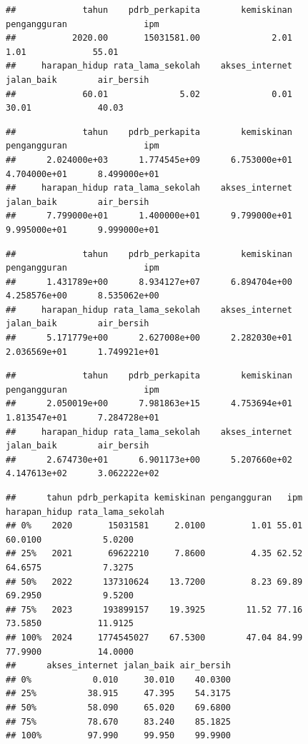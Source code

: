 \documentclass[
  12pt,
]{article}
\begin{document}
\begin{verbatim}
##             tahun    pdrb_perkapita        kemiskinan      pengangguran               ipm 
##           2020.00       15031581.00              2.01              1.01             55.01 
##     harapan_hidup rata_lama_sekolah    akses_internet        jalan_baik        air_bersih 
##             60.01              5.02              0.01             30.01             40.03
\end{verbatim}

\begin{verbatim}
##             tahun    pdrb_perkapita        kemiskinan      pengangguran               ipm 
##      2.024000e+03      1.774545e+09      6.753000e+01      4.704000e+01      8.499000e+01 
##     harapan_hidup rata_lama_sekolah    akses_internet        jalan_baik        air_bersih 
##      7.799000e+01      1.400000e+01      9.799000e+01      9.995000e+01      9.999000e+01
\end{verbatim}

\begin{verbatim}
##             tahun    pdrb_perkapita        kemiskinan      pengangguran               ipm 
##      1.431789e+00      8.934127e+07      6.894704e+00      4.258576e+00      8.535062e+00 
##     harapan_hidup rata_lama_sekolah    akses_internet        jalan_baik        air_bersih 
##      5.171779e+00      2.627008e+00      2.282030e+01      2.036569e+01      1.749921e+01
\end{verbatim}

\begin{verbatim}
##             tahun    pdrb_perkapita        kemiskinan      pengangguran               ipm 
##      2.050019e+00      7.981863e+15      4.753694e+01      1.813547e+01      7.284728e+01 
##     harapan_hidup rata_lama_sekolah    akses_internet        jalan_baik        air_bersih 
##      2.674730e+01      6.901173e+00      5.207660e+02      4.147613e+02      3.062222e+02
\end{verbatim}

\begin{verbatim}
##      tahun pdrb_perkapita kemiskinan pengangguran   ipm harapan_hidup rata_lama_sekolah
## 0%    2020       15031581     2.0100         1.01 55.01       60.0100            5.0200
## 25%   2021       69622210     7.8600         4.35 62.52       64.6575            7.3275
## 50%   2022      137310624    13.7200         8.23 69.89       69.2950            9.5200
## 75%   2023      193899157    19.3925        11.52 77.16       73.5850           11.9125
## 100%  2024     1774545027    67.5300        47.04 84.99       77.9900           14.0000
##      akses_internet jalan_baik air_bersih
## 0%            0.010     30.010    40.0300
## 25%          38.915     47.395    54.3175
## 50%          58.090     65.020    69.6800
## 75%          78.670     83.240    85.1825
## 100%         97.990     99.950    99.9900
\end{verbatim}
\end{document}
